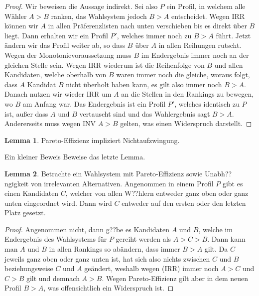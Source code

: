 \documentclass{zirkelblatt1415}
\theoremstyle{definition}
\theoremstyle{definition}
\theoremstyle{definition}
\theoremstyle{definition}
\newtheorem*{lem}{Lemma}
\theoremstyle{remark}
\begin{document}
\begin{proof}
Wir beweisen die Aussage indirekt. Sei also $P$ ein Profil, in welchem alle W\"ahler $A>B$ ranken, das Wahlsystem jedoch $B>A$ entscheidet.  Wegen IRR k\"onnen wir $A$ in allen Pr\"aferenzlisten nach unten verschieben bis es direkt \"uber $B$ liegt. Dann erhalten wir ein Profil $P'$, welches immer noch zu $B>A$ f\"uhrt. Jetzt \"andern wir das Profil weiter ab, so dass $B$ \"uber $A$ in allen Reihungen rutscht. Wegen der Monotonievoraussetzung muss $B$ im Endergebnis immer noch an der gleichen Stelle sein. Wegen IRR wiederum ist die Reihenfolge von $B$ und allen Kandidaten, welche oberhalb von $B$ waren immer noch die gleiche, woraus folgt, dass $A$ Kandidat $B$ nicht \"uberholt haben kann, es gilt also immer noch $B>A$. Danach nutzen wir wieder IRR um $A$ an die Stellen in den Rankings zu bewegen, wo $B$ am Anfang war. Das Endergebnis ist ein Profil $P'$, welches identisch zu $P$ ist, au\ss er dass $A$ und $B$ vertauscht sind und das Wahlergebnis sagt $B>A$. Andererseits muss wegen INV $A>B$ gelten, was einen Widerspruch darstellt. 
\end{proof}

\begin{lem}
Pareto-Effizienz impliziert Nichtaufzwingung.
\end{lem}

\begin{aufgabe}{Ein kleiner Beweis}
Beweise das letzte Lemma.
\end{aufgabe}

\begin{lem}
Betrachte ein Wahlsystem mit Pareto-Effizienz sowie Unabh??ngigkeit von irrelevanten Alternativen. Angenommen in einem Profil $P$ gibt es einen Kandidaten $C$, welcher von allen W??hlern entweder ganz oben oder ganz unten eingeordnet wird. Dann wird $C$ entweder auf den ersten oder den letzten Platz gesetzt.
\end{lem}

\begin{proof}
Angenommen nicht, dann g??be es Kandidaten $A$ und $B$, welche im Endergebnis des Wahlsystems f\"ur $P$ gereiht werden als $A>C>B$. Dann kann man $A$ und $B$ in allen Rankings so ab\"andern, dass immer $B>A$ gilt. Da $C$ jeweils ganz oben oder ganz unten ist, hat sich also nichts zwischen $C$ und $B$ beziehungsweise $C$ und $A$ ge\"andert, weshalb wegen (IRR) immer noch $A>C$ und $C>B$ gilt und demnach $A>B$. Wegen Pareto-Effizienz gilt aber in dem neuen Profil $B>A$, was offensichtlich ein Widerspruch ist.
\end{proof}
\end{document}
